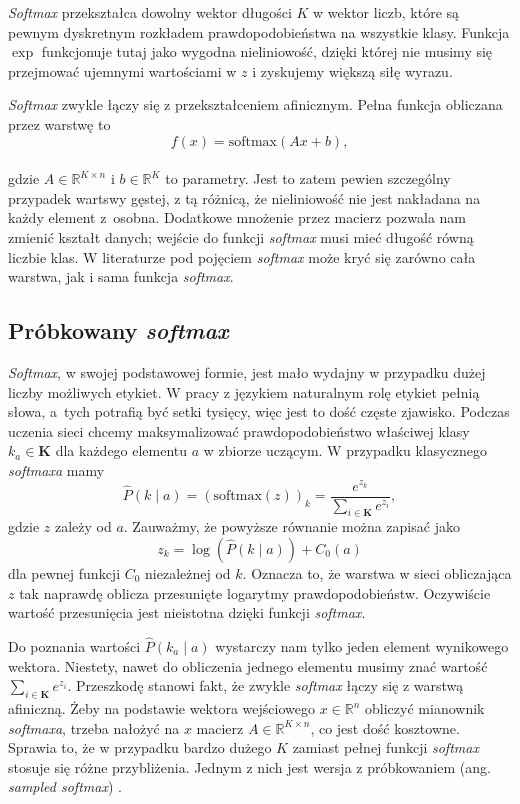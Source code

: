 \textit{Softmax} przekształca dowolny wektor długości $K$ w wektor liczb, które są pewnym dyskretnym rozkładem prawdopodobieństwa na wszystkie klasy. Funkcja $\exp$ funkcjonuje tutaj jako wygodna nieliniowość, dzięki której nie musimy się przejmować ujemnymi wartościami w $z$ i zyskujemy większą siłę wyrazu.

\textit{Softmax} zwykle łączy się z przekształceniem afinicznym. Pełna funkcja obliczana przez warstwę to
\[f(x) = \mathrm{softmax}(Ax + b),\]
\\
gdzie $A \in \mathbb{R}^{K \times n}$ i $b \in \mathbb{R}^{K}$ to parametry. Jest to zatem pewien szczególny przypadek wartswy gęstej, z tą różnicą, że nieliniowość nie jest nakładana na każdy element z~osobna. Dodatkowe mnożenie przez macierz pozwala nam zmienić kształt danych; wejście do funkcji \textit{softmax} musi mieć długość równą liczbie klas. W literaturze pod pojęciem \textit{softmax} może kryć się zarówno cała warstwa, jak i sama funkcja \textit{softmax}.


\subsection{Próbkowany \textit{softmax}} \label{ssoft}
\textit{Softmax}, w swojej podstawowej formie, jest mało wydajny w przypadku dużej liczby możliwych etykiet. W pracy z językiem naturalnym rolę etykiet pełnią słowa, a~tych potrafią być setki tysięcy, więc jest to dość częste zjawisko. Podczas uczenia sieci chcemy maksymalizować prawdopodobieństwo właściwej klasy $k_a \in \mathbf{K}$ dla każdego elementu $a$ w zbiorze uczącym. W przypadku klasycznego \textit{softmaxa} mamy
\[\hat{P}(k \mid a) = (\mathrm{softmax}(z))_{k} = \frac{e^{z_{k}}}{\sum_{i \in \mathbf{K}} e^{z_i}},\]
gdzie $z$ zależy od $a$. Zauważmy, że powyższe równanie można zapisać jako
\[z_k = \log(\hat{P}(k \mid a)) + C_0(a)\]
dla pewnej funkcji $C_0$ niezależnej od $k$. Oznacza to, że warstwa w sieci obliczająca $z$ tak naprawdę oblicza przesunięte logarytmy prawdopodobieństw. Oczywiście wartość przesunięcia jest nieistotna dzięki funkcji \textit{softmax}.

Do poznania wartości $\hat{P}(k_a \mid a)$ wystarczy nam tylko jeden element wynikowego wektora. Niestety, nawet do obliczenia jednego elementu musimy znać wartość $\sum_{i \in \mathbf{K}} e^{z_i}$. Przeszkodę stanowi fakt, że zwykle \textit{softmax} łączy się z warstwą afiniczną. Żeby na podstawie wektora wejściowego $x \in \mathbb{R}^n$ obliczyć mianownik \textit{softmaxa}, trzeba nałożyć na $x$ macierz $A \in \mathbb{R}^{K \times n}$, co jest dość kosztowne. Sprawia to, że w przypadku bardzo dużego $K$ zamiast pełnej funkcji \textit{softmax} stosuje się różne przybliżenia. Jednym z nich jest wersja z próbkowaniem (ang. \textit{sampled softmax}) \cite{ssoftmax}.

